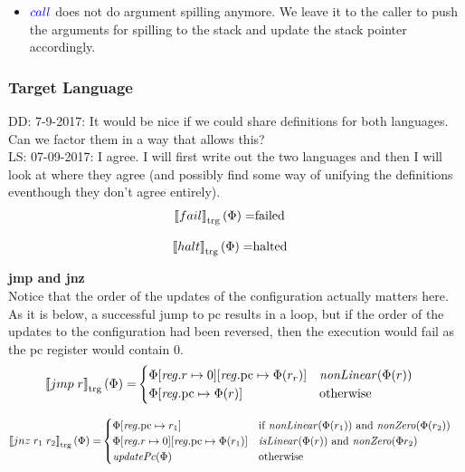 \documentclass[a4paper]{article}
\newcommand\lau[1]{{\color{purple} \sf \footnotesize {LS: #1}}\\}
\newcommand\dominique[1]{{\color{purple} \sf \footnotesize {DD: #1}}\\}
\newcommand{\sem}[1]{\left\llbracket #1 \right\rrbracket}
\newcommand{\tsem}[2][\Phi]{\sem{#2}_{\mathrm{trg}}(#1)}
\newcommand{\tand}{\text{ and }}
\newcommand{\totherwise}{\text{otherwise }}
\newcommand{\sourcecolor}[1]{\color{blue}}
\newcommand{\src}[1]{{\sourcecolor{} #1}}
\newcommand{\targetcolor}[1]{\color{black}}
\newcommand{\trg}[1]{{\targetcolor{} #1}}
\newcommand{\zinstr}[1]{#1}
\newcommand{\oneinstr}[2]{
  \ifthenelse{\equal{#2}{}}
  {\zinstr{#1}}
  {\zinstr{#1} \; #2}
}
\newcommand{\twoinstr}[3]{
  \ifthenelse{\equal{#2#3}{}}
  {\zinstr{#1}}
  {\zinstr{#1} \; #2 \; #3}
}
\newcommand{\scall}[2]{\twoinstr{\src{call}}{#1}{#2}}
\newcommand{\tfail}{\zinstr{\trg{fail}}}
\newcommand{\thalt}{\zinstr{\trg{halt}}}
\newcommand{\tjmp}[1]{\oneinstr{\trg{jmp}}{#1}}
\newcommand{\tjnz}[2]{\twoinstr{\trg{jnz}}{#1}{#2}}
\newcommand{\update}[2]{[#1 \mapsto #2]}
\newcommand{\updReg}[2]{\update{\reg.#1}{#2}}
\newcommand{\failed}{\mathrm{failed}}
\newcommand{\halted}{\mathrm{halted}}
\newcommand{\var}[1]{\mathit{#1}}
\newcommand{\reg}{\var{reg}}
\newcommand{\pcreg}{\mathrm{pc}}
\newcommand{\plainfun}[2]{
  \ifthenelse{\equal{#2}{}}
  {\mathit{#1}}
  {\mathit{#1}(#2)}
}
\newcommand{\updPcAddr}[1]{\plainfun{updatePc}{#1}}
\newcommand{\nonLinear}[1]{\plainfun{nonLinear}{#1}}
\newcommand{\isLinear}[1]{\plainfun{isLinear}{#1}}
\newcommand{\nonZero}[1]{\plainfun{nonZero}{#1}}
\begin{document}
\begin{itemize}
\item $\scall{}{}$ does not do argument spilling anymore. We leave it to the caller to push the arguments for spilling to the stack and update the stack pointer accordingly.
\end{itemize}

\subsubsection{Target Language}
\dominique{7-9-2017: It would be nice if we could share definitions for both languages.  Can we factor them in a way that allows this?}
\lau{07-09-2017: I agree. I will first write out the two languages and then I will look at where they agree (and possibly find some way of unifying the definitions eventhough they don't agree entirely).}

\begin{align*}
  \tsem{\tfail} = & \failed
\end{align*}

\begin{align*}
  \tsem{\thalt} = & \halted
\end{align*}

\textbf{jmp and jnz}\\
Notice that the order of the updates of the configuration actually matters here. As it is below, a successful jump to $\pcreg$ results in a loop, but if the order of the updates to the configuration had been reversed, then the execution would fail as the $\pcreg$ register would contain 0.
\begin{align*}
  \tsem{\tjmp{r}} = & 
                      \begin{cases}
                        \Phi\updReg{r}{0}\updReg{\pcreg}{\Phi(r_r)}
                             & \nonLinear{\Phi(r)} \\
                        \Phi\updReg{\pcreg}{\Phi(r)} & \totherwise
                      \end{cases}
\end{align*}

\begin{align*}
  \tsem{\tjnz{r_1}{r_2}} = &       
                             \begin{cases}
                               \Phi\updReg{\pcreg}{r_1} & \text{if $\nonLinear{\Phi(r_1)}$ and $\nonZero{\Phi(r_2)}$} \\
                               \Phi\updReg{r}{0}\updReg{\pcreg}{\Phi(r_1)}
                                               & \arraycolsep=0pt                               
                                               \begin{array}[t]{l}
                                                 \isLinear{\Phi(r)} \tand
                                                 \nonZero{\Phi{r_2}}
                                               \end{array}
\\
                               \updPcAddr{\Phi} & \totherwise
                             \end{cases}
\end{align*}
\end{document}
